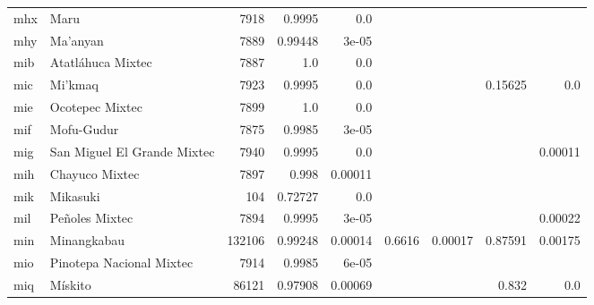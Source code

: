 \documentclass[11pt]{article}
\begin{document}
\begin{table*}[h]
{\begin{tabular}{llrrrrrrr}
mhx         & Maru         & 7918         & 0.9995         & 0.0         &          &          &          &          \\

mhy         & Ma'anyan         & 7889         & 0.99448         & 3e-05         &          &          &          &          \\

mib         & Atatláhuca Mixtec         & 7887         & 1.0         & 0.0         &          &          &          &          \\

mic         & Mi'kmaq         & 7923         & 0.9995         & 0.0         &          &          & 0.15625         & 0.0         \\

mie         & Ocotepec Mixtec         & 7899         & 1.0         & 0.0         &          &          &          &          \\

mif         & Mofu-Gudur         & 7875         & 0.9985         & 3e-05         &          &          &          &          \\

mig         & San Miguel El Grande Mixtec         & 7940         & 0.9995         & 0.0         &          &          &          & 0.00011         \\

mih         & Chayuco Mixtec         & 7897         & 0.998         & 0.00011         &          &          &          &          \\

mik         & Mikasuki         & 104         & 0.72727         & 0.0         &          &          &          &          \\

mil         & Peñoles Mixtec         & 7894         & 0.9995         & 3e-05         &          &          &          & 0.00022         \\

min         & Minangkabau         & 132106         & 0.99248         & 0.00014         & 0.6616         & 0.00017         & 0.87591         & 0.00175         \\

mio         & Pinotepa Nacional Mixtec         & 7914         & 0.9985         & 6e-05         &          &          &          &          \\

miq         & Mískito         & 86121         & 0.97908         & 0.00069         &          &          & 0.832         & 0.0         \\


\end{tabular}}
\end{table*}
\end{document}

